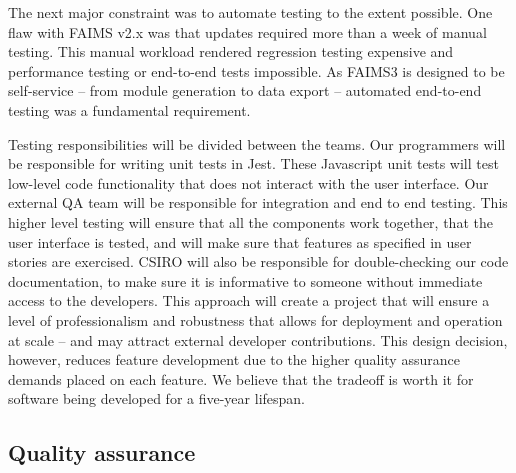 \documentclass[a4paper,headings=small fontsize=10pt]{scrreprt}
\begin{document}
The next major constraint was to automate testing to the extent
possible. One flaw with FAIMS v2.x was that updates required more than a
week of manual testing. This manual workload rendered regression testing
expensive and performance testing or end-to-end tests impossible. As
FAIMS3 is designed to be self-service -- from module generation to
data export -- automated end-to-end testing was a fundamental
requirement.

Testing responsibilities will be divided between the teams. Our
programmers will be responsible for writing unit tests in Jest. These
Javascript unit tests will test low-level code functionality that does
not interact with the user interface. Our external QA team will be
responsible for integration and end to end testing. This higher level
testing will ensure that all the components work together, that the user
interface is tested, and will make sure that features as specified in
user stories are exercised. CSIRO will also be responsible for
double-checking our code documentation, to make sure it is informative
to someone without immediate access to the developers. This approach
will create a project that will ensure a level of professionalism and
robustness that allows for deployment and operation at scale -- and
may attract external developer contributions. This design decision,
however, reduces feature development due to the higher quality assurance
demands placed on each feature. We believe that the tradeoff is worth it
for software being developed for a five-year lifespan.

\subsection{Quality assurance}
\end{document}
